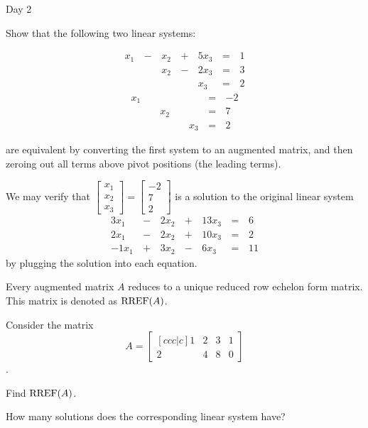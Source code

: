 \begin{applicationActivities}{Day 2}
\begin{activity}{10}
  Show that the following two linear systems:
  \begin{multicols}{2}\noindent
    \begin{alignat*}{4}
       x_1 &\,-\,&  x_2  &\,+\,&  5x_3 &\,=\,& 1 \\
           &\, \,&  x_2 &\,-\,&  2x_3 &\,=\,& 3 \\
           &\, \,&      &\, \,&   x_3 &\,=\,& 2
    \end{alignat*}
      \begin{alignat*}{4}
         x_1 &\, \,&      &\, \,&       &\,=\,& -2 \\
             &\, \,&  x_2 &\, \,&       &\,=\,& 7 \\
             &\, \,&      &\, \,&   x_3 &\,=\,& 2
      \end{alignat*}
  \end{multicols}
  are equivalent by converting the first system to an augmented matrix,
  and then zeroing out all terms above pivot positions (the leading terms).
\end{activity}

\begin{remark}
  We may verify that \(\begin{bmatrix}x_1\\x_2\\x_3\end{bmatrix}=
  \begin{bmatrix}-2\\7\\2\end{bmatrix}\) is a solution to the
  original linear system
    \begin{alignat*}{4}
      3x_1 &\,-\,& 2x_2 &\,+\,& 13x_3 &\,=\,& 6 \\
      2x_1 &\,-\,& 2x_2 &\,+\,& 10x_3 &\,=\,& 2 \\
     -1x_1 &\,+\,& 3x_2 &\,-\,&  6x_3 &\,=\,& 11
    \end{alignat*}
  by plugging the solution into each equation.
\end{remark}

\begin{fact}
  Every augmented matrix \(A\) reduces to a unique reduced row echelon form
  matrix. This matrix is denoted as \(\operatorname{RREF}(A)\).
\end{fact}

\begin{activity}{10}
  Consider the matrix \[
  A = \begin{bmatrix}[ccc|c]
    1 & 2 & 3 & 1\\
    2 & 4 & 8 & 0
  \end{bmatrix}
  \].
  \begin{subactivity}
    Find \(\operatorname{RREF}(A)\).
  \end{subactivity}
  \begin{subactivity}
    How many solutions does the corresponding linear system have?
  \end{subactivity}
\end{activity}





\end{applicationActivities}
